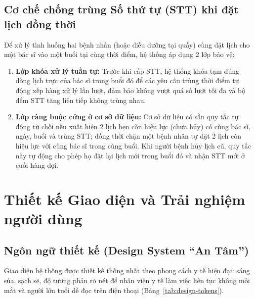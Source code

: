 \documentclass[12pt,a4paper]{report}
\begin{document}
\section{Cơ chế chống trùng Số thứ tự (STT) khi đặt lịch đồng thời}

Để xử lý tình huống hai bệnh nhân (hoặc điều dưỡng tại quầy) cùng đặt lịch cho một bác sĩ vào một buổi tại cùng thời điểm, hệ thống áp dụng 2 lớp bảo vệ:
\begin{enumerate}
  \item \textbf{Lớp khóa xử lý tuần tự:} Trước khi cấp STT, hệ thống khóa tạm đúng dòng lịch trực của bác sĩ trong buổi đó để các yêu cầu trùng thời điểm tự động xếp hàng xử lý lần lượt, đảm bảo không vượt quá số lượt tối đa và bộ đếm STT tăng liên tiếp không trùng nhau.
  \item \textbf{Lớp ràng buộc cứng ở cơ sở dữ liệu:} Cơ sở dữ liệu có sẵn quy tắc tự động từ chối nếu xuất hiện 2 lịch hẹn còn hiệu lực (chưa hủy) có cùng bác sĩ, ngày, buổi và trùng STT; đồng thời chặn một bệnh nhân tự đặt 2 lịch còn hiệu lực với cùng bác sĩ trong cùng buổi. Khi người bệnh hủy lịch cũ, quy tắc này tự động cho phép họ đặt lại lịch mới trong buổi đó và nhận STT mới ở cuối hàng đợi.
\end{enumerate}

\chapter{Thiết kế Giao diện và Trải nghiệm người dùng}

\section{Ngôn ngữ thiết kế (Design System ``An Tâm'')}

Giao diện hệ thống được thiết kế thống nhất theo phong cách y tế hiện đại: sáng sủa, sạch sẽ, độ tương phản rõ nét để nhân viên y tế làm việc liên tục không mỏi mắt và người lớn tuổi dễ đọc trên điện thoại (Bảng~\ref{tab:design-tokens}).
\end{document}
